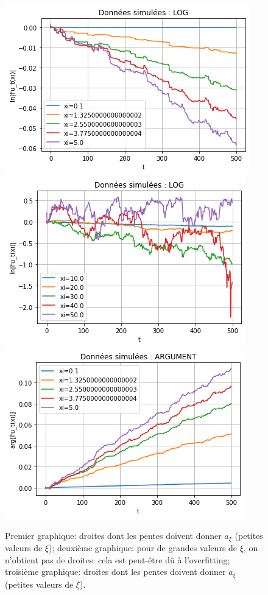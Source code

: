 \documentclass[12pt]{article}
\begin{document}
\begin{figure}[h]
  \begin{center}
    \includegraphics[scale=0.6]{img/iv_verif_pxi.png}
    \includegraphics[scale=0.6]{img/iv_verif_grxi.png}
    \includegraphics[scale=0.6]{img/iv_verif_pxi_im.png}
  \end{center}
  \caption{\label{fig:iv_verif}Premier graphique: droites dont les pentes doivent donner $a_{\xi}$ (petites valeurs de $\xi$); deuxième graphique: pour de grandes valeurs de $\xi$, on n'obtient pas de droites: cela est peut-être dû à l'overfitting; troisième graphique: droites dont les pentes doivent donner $a_{\xi}$ (petites valeurs de $\xi$).}
\end{figure}
\end{document}
